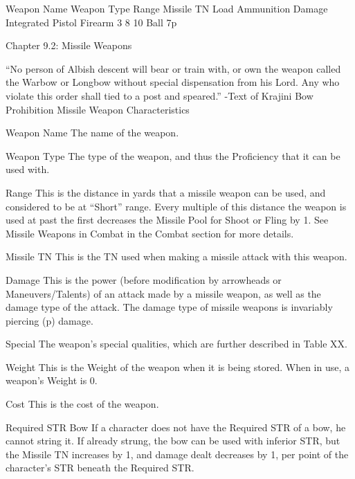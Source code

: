\documentclass[oneside,11pt,english]{book}
\begin{document}
 

Weapon Name Weapon Type Range Missile TN Load Ammunition Damage 
Integrated Pistol Firearm 3 8 10 Ball 7p 

 

Chapter 9.2: Missile Weapons 

 

“No person of Albish descent will bear or train with, or own the weapon called the Warbow or Longbow 
without special dispensation from his Lord. Any who violate this order shall tied to a post and speared.” 
-Text of Krajini Bow Prohibition 
Missile Weapon Characteristics 

 

Weapon Name 
The name of the weapon. 

 

Weapon Type 
The type of the weapon, and thus the Proficiency that it can be used with. 

 

Range 
This is the distance in yards that a missile weapon can be used, and considered to be at “Short” range. 
Every multiple of this distance the weapon is used at past the first decreases the Missile Pool for Shoot or 
Fling by 1. See Missile Weapons in Combat in the Combat section for more details. 


 

Missile TN 
This is the TN used when making a missile attack with this weapon. 

 

Damage 
This is the power (before modification by arrowheads or Maneuvers/Talents) of an attack made by a 
missile weapon, as well as the damage type of the attack. The damage type of missile weapons is 
invariably piercing (p) damage. 

 

Special 
The weapon’s special qualities, which are further described in Table XX. 

 

Weight 
This is the Weight of the weapon when it is being stored. When in use, a weapon’s Weight is 0. 

 

Cost 
This is the cost of the weapon. 

 

Required STR 
Bow 
If a character does not have the Required STR of a bow, he cannot string it. If already strung, the bow can 
be used with inferior STR, but the Missile TN increases by 1, and damage dealt decreases by 1, per point 
of the character’s STR beneath the Required STR. 
\end{document}
